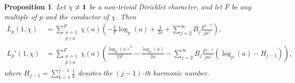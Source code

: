 \documentclass[pdflatex,sn-mathphys-num]{sn-jnl}%
\theoremstyle{plain}
\newtheorem{prop}[thm]{Proposition}
\theoremstyle{definition}
\theoremstyle{remark}
\numberwithin{equation}{section}
\begin{document}
\begin{prop} Let $\chi  \neq {\bf 1}$ be a non-trivial Dirichlet character, and let $F$ be any multiple of $p$ and the conductor of $\chi$. Then
\begin{align*}
 L_p(1,\chi) & =  \sum_{\substack{a=1 \\ p \nmid a}}^F \chi(a) \left( - \frac{1}{F} \log_p(a) + \frac{1}{2a} + \sum_{j=2}^{\infty} B_j \frac{F^{j-1}}{j a^j} \right)  , \\
 L_p'(1,\chi) & =  \sum_{\substack{a=1 \\ p \nmid a}}^F \chi(a) \left( \frac{\log_p(a)^2}{2F}   -  \frac{\log_p(a)}{2a} - \sum_{j=2}^{\infty} B_j \frac{F^{j-1}}{j a^j} \left(\log_p(a) - 
 H_{j-1} \right) \right)  ,
 \end{align*}
 \label{format1}
 where $H_{j-1} = \displaystyle\sum_{k=1}^{j-1} \frac{1}{k}$ denotes the $(j-1)$-th harmonic number.
 \end{prop}
\end{document}
